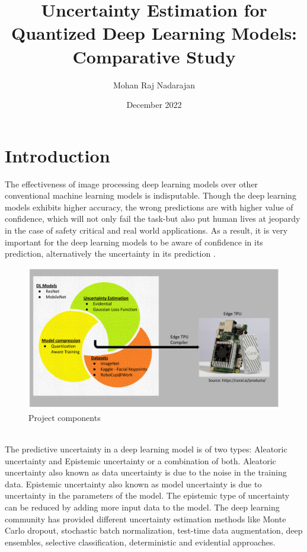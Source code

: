 \documentclass[rnd]{mas_proposal}
\title{Uncertainty Estimation for Quantized Deep Learning Models: Comparative Study}
\author{Mohan Raj Nadarajan}
\date{December 2022}
\begin{document}
\maketitle
\pagestyle{plain}
\section{Introduction}
The effectiveness of image processing deep learning models over other conventional machine learning models is indisputable. Though the deep learning models  exhibits higher accuracy, the wrong predictions are with higher value of confidence, which will not only fail the task-but also put human lives at jeopardy in the case of safety critical and real world applications\cite{gawlikowski2021survey}. As a result, it is very important for the deep learning models to be aware of confidence in its prediction, alternatively the uncertainty in its prediction .
\begin{figure}[h!]
    \includegraphics[width=\textwidth]{images/VennDiagram_V4.png}
    \caption{Project components}
    \label{fig:myfigure}
\end{figure}
\\
The predictive uncertainty in a deep learning model is of two types: Aleatoric uncertainty and Epistemic uncertainty or a combination of both\cite{ue_qunatification}. Aleatoric uncertainty also known as data uncertainty is due to the noise in the training data. Epistemic uncertainty also known as model uncertainty is due to uncertainty in the parameters of the model. The epistemic type of uncertainty can be reduced by adding more input data to the model. The deep learning community has provided different uncertainty estimation methods like Monte Carlo dropout\cite{gal2016dropout}, stochastic batch normalization\cite{atanov2018uncertainty}, test-time data augmentation\cite{ayhan2018test}, deep ensembles\cite{lakshminarayanan2017simple}, selective classification\cite{geifman2017selective}, deterministic\cite{abs-2003-02037} and evidential\cite{DBLP:journals/corr/abs-1806-01768} approaches.
\end{document}
